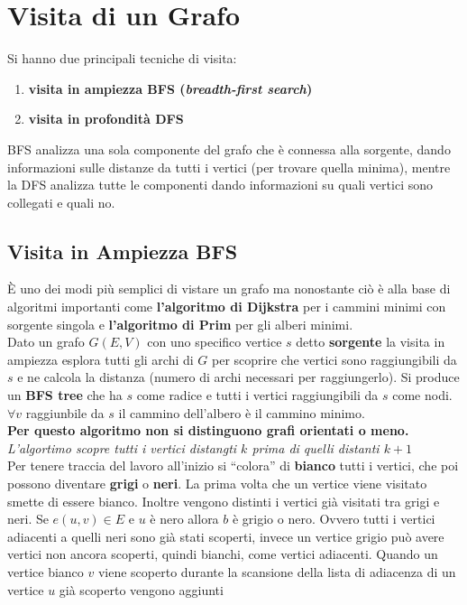 \documentclass[a4paper,12pt, oneside]{book}
\begin{document}
\section{Visita di un Grafo}
Si hanno due principali tecniche di visita:
\begin{enumerate}
  \item \textbf{visita in ampiezza BFS (\textit{breadth-first search})}
  \item \textbf{visita in profondità DFS}
\end{enumerate}
BFS analizza una sola componente del grafo che è connessa alla
sorgente, dando informazioni sulle distanze da tutti i vertici (per
trovare quella minima), mentre la DFS analizza tutte le componenti
dando informazioni su quali vertici sono collegati e quali no.
\subsection{Visita in Ampiezza BFS}
È uno dei modi più semplici di vistare un grafo ma nonostante ciò è
alla base di algoritmi importanti come \textbf{l'algoritmo di
  Dijkstra} per i cammini minimi con sorgente singola e
\textbf{l'algoritmo di Prim} per gli alberi minimi.\\
Dato un grafo $G(E,V)$ con uno specifico vertice $s$ detto
\textbf{sorgente} la visita in ampiezza esplora tutti gli archi di $G$
per scoprire che vertici sono raggiungibili da $s$ e ne calcola la
distanza (numero di archi necessari per raggiungerlo). Si produce un
\textbf{BFS tree} che ha $s$ come radice e tutti i vertici
raggiungibili da $s$ come nodi. $\forall v$ raggiunbile da $s$ il
cammino dell'albero è il cammino minimo.\\
\textbf{Per questo algoritmo non si distinguono grafi orientati o
  meno.}\\
\textit{L'algortimo scopre tutti i vertici distangti $k$ prima di
  quelli distanti $k+1$}\\
Per tenere traccia del lavoro all'inizio si ``colora'' di
\textbf{bianco} tutti i vertici, che poi possono diventare
\textbf{grigi} o \textbf{neri}. La prima volta che un vertice viene
visitato smette di essere bianco. Inoltre vengono distinti i vertici
già visitati tra grigi e neri. Se $e(u,v)\in E$ e $u$ è nero allora
$b$ è grigio o nero. Ovvero tutti i vertici adiacenti a quelli neri
sono già stati scoperti, invece un vertice grigio può avere vertici
non ancora scoperti, quindi bianchi, come vertici adiacenti. Quando un
vertice bianco $v$ viene scoperto durante la scansione della lista
di adiacenza di un vertice $u$ già scoperto vengono aggiunti
\end{document}
